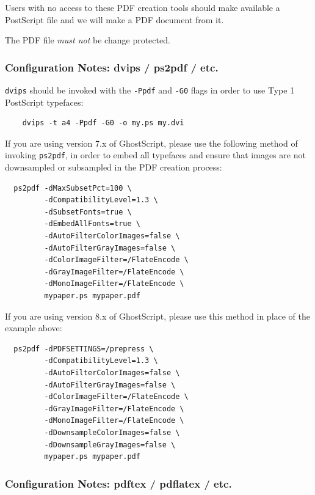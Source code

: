 \documentclass{egpubl-eurovis-short}
\begin{document}
Users with no access to these PDF creation tools should make available a
PostScript file and we will make a PDF document from it.

The PDF file \emph{must not} be change protected.

\subsubsection*{Configuration Notes: dvips / ps2pdf / etc.}

\noindent
\texttt{dvips} should be invoked with the \texttt{-Ppdf} and \texttt{-G0}
flags in order to use Type 1 PostScript typefaces:

\begin{verbatim}
    dvips -t a4 -Ppdf -G0 -o my.ps my.dvi
\end{verbatim}


\noindent
If you are using version 7.x of GhostScript, please use the following method of invoking \texttt{ps2pdf}, in
order to embed all typefaces and ensure that images are not downsampled or subsampled in the PDF
creation process:

\begin{verbatim}
  ps2pdf -dMaxSubsetPct=100 \
         -dCompatibilityLevel=1.3 \
         -dSubsetFonts=true \
         -dEmbedAllFonts=true \
         -dAutoFilterColorImages=false \
         -dAutoFilterGrayImages=false \
         -dColorImageFilter=/FlateEncode \
         -dGrayImageFilter=/FlateEncode \
         -dMonoImageFilter=/FlateEncode \
         mypaper.ps mypaper.pdf
\end{verbatim}


If you are using version 8.x of GhostScript, please use this method in place of the example above:
\begin{verbatim}
  ps2pdf -dPDFSETTINGS=/prepress \
         -dCompatibilityLevel=1.3 \
         -dAutoFilterColorImages=false \
         -dAutoFilterGrayImages=false \
         -dColorImageFilter=/FlateEncode \
         -dGrayImageFilter=/FlateEncode \
         -dMonoImageFilter=/FlateEncode \
         -dDownsampleColorImages=false \
         -dDownsampleGrayImages=false \
         mypaper.ps mypaper.pdf
\end{verbatim}

\subsubsection*{Configuration Notes: pdftex / pdflatex / etc.}
\end{document}
